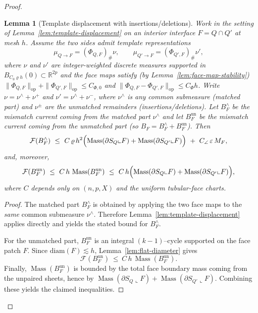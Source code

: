 \documentclass[11pt]{article}
\numberwithin{equation}{section}  %
\theoremstyle{plain}
\newtheorem{lemma}[theorem]{Lemma}
\theoremstyle{definition}
\theoremstyle{remark}
\newcommand{\R}{\mathbb{R}}
\DeclareMathOperator{\Mass}{Mass}
\begin{document}
\begin{proof}
\begin{lemma}[Template displacement with insertions/deletions]\label{lem:template-displacement-edits}
Work in the setting of Lemma~\ref{lem:template-displacement} on an interior interface $F=Q\cap Q'$ at mesh $h$.
Assume the two sides admit template representations
\[
\mu_{Q\to F}=(\Phi_{Q,F})_\#\nu,
\qquad
\mu_{Q'\to F}=(\Phi_{Q',F})_\#\nu',
\]
where $\nu$ and $\nu'$ are integer-weighted discrete measures supported in $B_{C_0\varrho h}(0)\subset\R^{2p}$ {and the face maps satisfy (by Lemma~\ref{lem:face-map-stability})}
$\|\Phi_{Q,F}\|_{\mathrm{op}}+\|\Phi_{Q',F}\|_{\mathrm{op}}\le C_{\Phi,0}$ and $\|\Phi_{Q,F}-\Phi_{Q',F}\|_{\mathrm{op}}\le C_\Phi h$.
Write $\nu=\nu^{\wedge}+\nu^{+}$ and $\nu'=\nu^{\wedge}+\nu^{-}$, where $\nu^{\wedge}$ is any common submeasure (matched part) and
$\nu^{\pm}$ are the unmatched remainders (insertions/deletions).
Let $B_F^{\wedge}$ be the mismatch current coming from the matched part $\nu^{\wedge}$ and let $B_F^{\mathrm{un}}$ be the mismatch current
coming from the unmatched part (so $B_F=B_F^{\wedge}+B_F^{\mathrm{un}}$).
Then
\[
\mathcal F(B_F^{\wedge})\ \le\ C\,\varrho\,h^2\Bigl(\Mass(\partial S_Q\llcorner F)+\Mass(\partial S_{Q'}\llcorner F)\Bigr)\ +\ C_{\angle}\,\varepsilon\,M_F,
\]
and, moreover,
\[
\mathcal F(B_F^{\mathrm{un}})\ \le\ C\,h\,\Mass(B_F^{\mathrm{un}})\ \le\ C\,h\Bigl(\Mass(\partial S_Q\llcorner F)+\Mass(\partial S_{Q'}\llcorner F)\Bigr),
\]
where $C$ depends only on $(n,p,X)$ and the uniform tubular-face charts.
\end{lemma}

\begin{proof}
The matched part $B_F^{\wedge}$ is obtained by applying the two face maps to the \emph{same} common submeasure $\nu^{\wedge}$.
Therefore Lemma~\ref{lem:template-displacement} applies directly and yields the stated bound for $B_F^{\wedge}$.

For the unmatched part, $B_F^{\mathrm{un}}$ is an integral $(k-1)$--cycle supported on the face patch $F$.
Since $\mathrm{diam}(F)\lesssim h$, Lemma~\ref{lem:flat-diameter} gives
\[
\mathcal F(B_F^{\mathrm{un}})\ \le\ C\,h\,\Mass(B_F^{\mathrm{un}}).
\]
Finally, $\Mass(B_F^{\mathrm{un}})$ is bounded by the total face boundary mass coming from the unpaired sheets, hence by
\(
\Mass(\partial S_Q\llcorner F)+\Mass(\partial S_{Q'}\llcorner F).
\)
Combining these yields the claimed inequalities.
\end{proof}


\end{proof}
\end{document}
